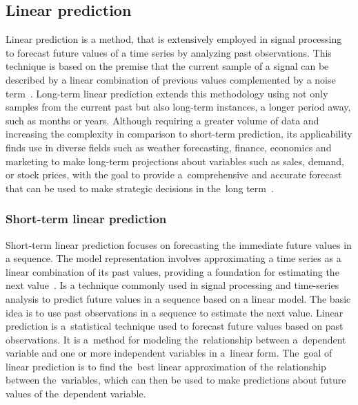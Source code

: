 \documentclass[12pt]{article}
\begin{document}
    \subsection{Linear prediction}\label{lp}
    Linear prediction is a method, that is extensively employed in signal
    processing to forecast future values of a time series by analyzing past observations.
    This technique is based on the premise that the current sample of a signal can be described by a linear combination
    of previous values complemented by a noise term~\cite{vaidyanathan2007theory,  WOS:000415735500004}. Long-term linear
    prediction extends this methodology using not only samples from the current past but also long-term instances, a longer period away, such as months
    or years. Although requiring a greater volume of data and increasing the complexity in comparison to
    short-term prediction, its applicability finds use in diverse fields such as weather forecasting, finance, economics and
    marketing to make long-term projections about variables such as sales, demand, or stock
    prices, with the goal to provide a~comprehensive and accurate forecast that can be used to
    make strategic decisions in the~long term~\cite{WOS:A1989AG08300005}.
    \subsubsection{Short-term linear prediction}\label{slp}
    Short-term linear prediction focuses on forecasting the immediate future values in a sequence.
    The model representation involves approximating a time series as a linear
    combination of its past values, providing a foundation for estimating the next value~\cite{WOS:000836807400001}.
    Is a technique commonly used in signal processing and time-series analysis to predict future
    values in a sequence based on a linear model.
    The basic idea is to use past observations in a sequence to estimate the next value.
    Linear prediction is a~statistical technique used to forecast future values based on past
    observations. It is a~method for modeling the~relationship between a~dependent variable and
    one or more independent variables in a~linear form. The~goal of linear prediction is to find
    the~best linear approximation of the relationship between the~variables, which can then be
    used to make predictions about future values of the~dependent variable.
\end{document}
